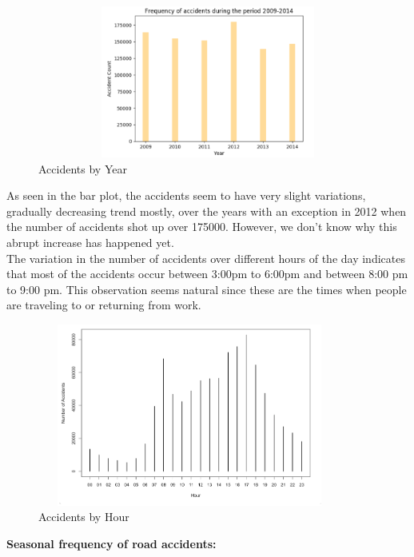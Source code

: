 \documentclass[a4paper, 10pt]{article}
\begin{document}
\begin{figure}[H]
   \begin{center}
   \caption{Accidents by Year}
     \includegraphics[width=20cm,height=5cm, scale=0.8,keepaspectratio]{counts.png}
   \end{center}
\end{figure}

   As seen in the bar plot, the accidents seem to have very slight variations, gradually decreasing trend mostly, over the years with an exception in 2012 when the number of accidents
   shot up over 175000. However, we don't know why this abrupt increase has happened yet. \\

   The variation in the number of accidents over different hours of the day indicates that most of the accidents occur between 3:00pm to 6:00pm and between 8:00 pm to 9:00 pm.
   This observation seems natural since these are the times when people are traveling to or returning from work.
   
\begin{figure}[H]
   \begin{center}
   \caption{Accidents by Hour}
     \includegraphics[width=10cm,height=6cm, scale=0.8,keepaspectratio]{hour-study.png}
   \end{center}
\end{figure}

\textbf{Seasonal frequency of road accidents:}
\end{document}
